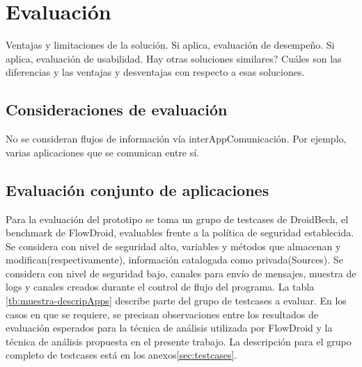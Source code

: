 \label{ch:evaluacion}
\chapter{Evaluación}
Ventajas y limitaciones de la solución.\newline 
Si aplica, evaluación de desempeño.  \newline 
Si aplica, evaluación de usabilidad.  
Hay otras soluciones similares? \newline 
Cuáles son las diferencias y las ventajas y desventajas con respecto a esas soluciones.

\section{Consideraciones de evaluación}
No se consideran flujos de información vía interAppComunicación. Por ejemplo,
varias aplicaciones que se comunican entre sí.

\section{Evaluación conjunto de aplicaciones}
Para la evaluación del prototipo se toma un grupo de testcases de DroidBech, el
benchmark de FlowDroid, evaluables frente a la política de seguridad
establecida.\newline 
Se considera con nivel de seguridad alto, variables y métodos que almacenan y
modifican(respectivamente), información catalogada como privada(Sources).\newline 
Se considera con nivel de seguridad bajo, canales para envío de mensajes,
muestra de logs y canales creados durante el control de flujo del programa.\newline 
La tabla \ref{tb:muestra-descripApps} describe parte del grupo de testcases a
evaluar. En los casos en que se requiere, se precisan observaciones entre los
resultados de evaluación esperados para la técnica de análisis utilizada por
FlowDroid y la técnica de análisis propuesta en el presente trabajo.\newline 
La descripción para el grupo completo de testcases está en los anexos\ref{sec:testcases}.

